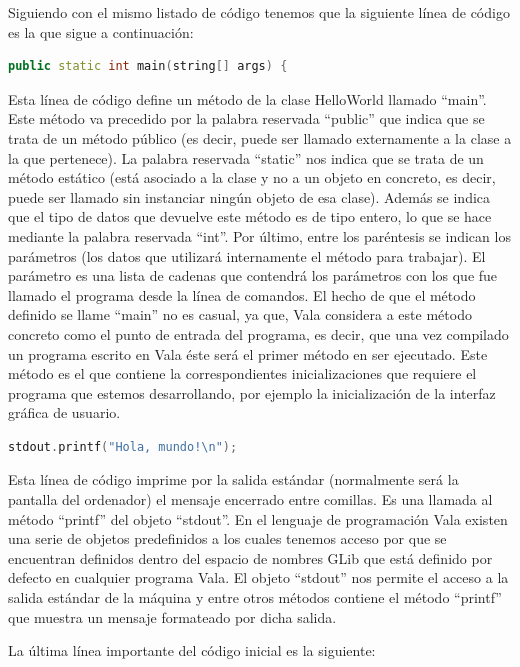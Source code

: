 \documentclass[12pt,twoside]{book}
\begin{document}
Siguiendo con el mismo listado de código tenemos que la siguiente línea de código es la que sigue a continuación:

\begin{lstlisting}[language=C++]
public static int main(string[] args) {
\end{lstlisting}

Esta línea de código define un método de la clase HelloWorld llamado ``main''. Este método va precedido por la palabra reservada ``public'' que indica que se trata de un método público (es decir, puede ser llamado externamente a la clase a la que pertenece). La palabra reservada ``static'' nos indica que se trata de un método estático (está asociado a la clase y no a un objeto en concreto, es decir, puede ser llamado sin instanciar ningún objeto de esa clase). Además se indica que el tipo de datos que devuelve este método es de tipo entero, lo que se hace mediante la palabra reservada ``int''. Por último, entre los paréntesis se indican los parámetros (los datos que utilizará internamente el método para trabajar). El parámetro es una lista de cadenas que contendrá los parámetros con los que fue llamado el programa desde la línea de comandos. El hecho de que el método definido se llame ``main'' no es casual, ya que, Vala considera a este método concreto como el punto de entrada del programa, es decir, que una vez compilado un programa escrito en Vala éste será el primer método en ser ejecutado. Este método es el que contiene la correspondientes inicializaciones que requiere el programa que estemos desarrollando, por ejemplo la inicialización de la interfaz gráfica de usuario.

\begin{lstlisting}[language=C++]
stdout.printf("Hola, mundo!\n");
\end{lstlisting}
Esta línea de código imprime por la salida estándar (normalmente será la pantalla del ordenador) el mensaje encerrado entre comillas. Es una llamada al método ``printf'' del objeto ``stdout''. En el lenguaje de programación Vala existen una serie de objetos predefinidos a los cuales tenemos acceso por que se encuentran definidos dentro del espacio de nombres GLib que está definido por defecto en cualquier programa Vala. El objeto ``stdout'' nos permite el acceso a la salida estándar de la máquina y entre otros métodos contiene el método ``printf'' que muestra un mensaje formateado por dicha salida.

La última línea importante del código inicial es la siguiente:
\end{document}
